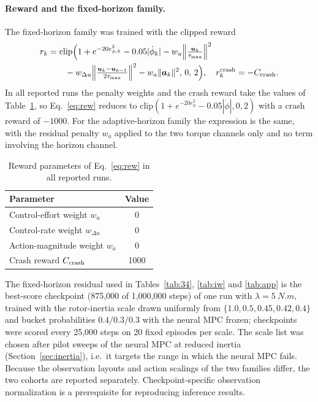 \documentclass[preprint,12pt,authoryear=false]{elsarticle}
\theoremstyle{remark}\newtheorem{remark}{Remark}
\theoremstyle{plain}\newtheorem{proposition}{Proposition}\newtheorem{lemma}{Lemma}
\theoremstyle{definition}\newtheorem{assumption}{Assumption}
\newcommand{\tmax}{\tau_{\max}}
\begin{document}
\paragraph{Reward and the fixed-horizon family.}
The fixed-horizon family was trained with the clipped reward
\begin{equation}
\begin{split}
r_k&=\mathrm{clip}\Big(1+e^{-20e_{\phi,k}^2}-0.05|\dot\phi_k|-w_u\Big\|\tfrac{\bm u_k}{\tmax}\Big\|^2\\
&\qquad-w_{\Delta u}\Big\|\tfrac{\bm u_k-\bm u_{k-1}}{2\tmax}\Big\|^2-w_a\|\bm a_k\|^2,\,0,\,2\Big),\quad r_k^{\rm crash}=-C_{\rm crash}.
\end{split}\label{eq:rew}
\end{equation}
In all reported runs the penalty weights and the crash reward take the values of Table~\ref{tab:rew}, so Eq.~\eqref{eq:rew} reduces to $\mathrm{clip}(1+e^{-20e_\phi^2}-0.05|\dot\phi|,0,2)$ with a crash reward of $-1000$. For the adaptive-horizon family the expression is the same, with the residual penalty $w_a$ applied to the two torque channels only and no term involving the horizon channel.

\begin{table}[t]\centering\small
\caption{Reward parameters of Eq.~\eqref{eq:rew} in all reported runs.}\label{tab:rew}
\begin{tabular}{lc}\toprule
Parameter & Value\\\midrule
Control-effort weight $w_u$ & 0\\
Control-rate weight $w_{\Delta u}$ & 0\\
Action-magnitude weight $w_a$ & 0\\
Crash reward $C_{\rm crash}$ & 1000\\\bottomrule
\end{tabular}
\end{table}

The fixed-horizon residual used in Tables~\ref{tab:34}, \ref{tab:iw} and \ref{tab:app} is the best-score checkpoint (875{,}000 of 1{,}000{,}000 steps) of one run with $\lambda=\SI{5}{N.m}$, trained with the rotor-inertia scale drawn uniformly from $\{1.0,0.5,0.45,0.42,0.4\}$ and bucket probabilities $0.4/0.3/0.3$ with the neural MPC frozen; checkpoints were scored every 25{,}000 steps on 20 fixed episodes per scale. The scale list was chosen after pilot sweeps of the neural MPC at reduced inertia (Section~\ref{sec:inertia}), i.e.\ it targets the range in which the neural MPC fails. Because the observation layouts and action scalings of the two families differ, the two cohorts are reported separately. Checkpoint-specific observation normalization is a prerequisite for reproducing inference results.
\end{document}
